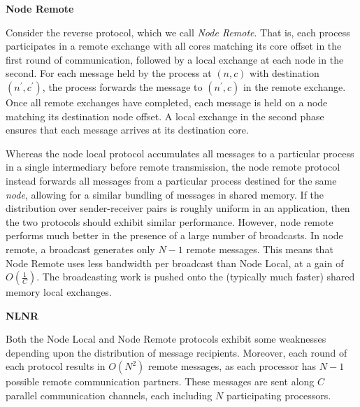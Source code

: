 \documentclass{report}
\begin{document}
\bigskip
\noindent
\textbf{Node Remote}

\noindent
Consider the reverse protocol, which we call \emph{Node Remote}.
That is, each process participates in a remote exchange with all cores matching its core offset in the first round of communication, followed by a local exchange at each node in the second. 
For each message held by the process at $(n, c)$ with destination $(n^\prime, c^\prime)$, the process forwards the message to $(n^\prime, c)$ in the remote exchange.
Once all remote exchanges have completed, each message is held on a node matching its destination node offset. 
A local exchange in the second phase ensures that each message arrives at its destination core. 

Whereas the node local protocol accumulates all messages to a particular process in a single intermediary before remote transmission, the node remote protocol instead forwards all messages from a particular process destined for the same \emph{node}, allowing for a similar bundling of messages in shared memory.
If the distribution over sender-receiver pairs is roughly uniform in an application, then the two protocols should exhibit similar performance.
However, node remote performs much better in the presence of a large number of broadcasts. 
In node remote, a broadcast generates only $N-1$ remote messages.
This means that Node Remote uses less bandwidth per broadcast than Node Local, at a gain of $O \left (\frac{1}{C} \right )$.
The broadcasting work is pushed onto the (typically much faster) shared memory local exchanges. 

\bigskip
\noindent
\textbf{NLNR}

\noindent
Both the Node Local and Node Remote protocols exhibit some weaknesses depending upon the distribution of message recipients.
Moreover, each round of each protocol results in $O \left (N^2 \right )$ remote messages, as each processor has $N-1$ possible remote communication partners.
These messages are sent along $C$ parallel communication channels, each including $N$ participating processors.
\end{document}
